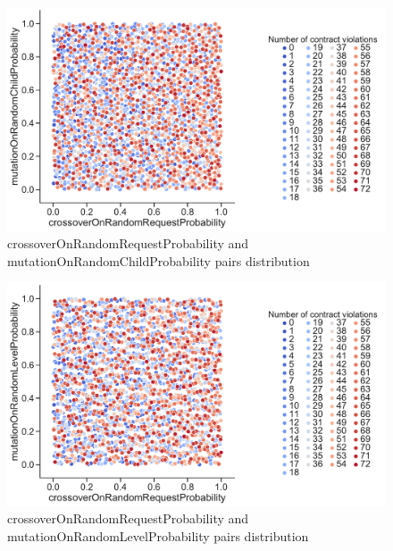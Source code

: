 \begin{figure}
	\centering
	\includegraphics[width=\textwidth]{images/PairsDistr/crossoverOnRandomRequestProbability_mutationOnRandomChildProbability.pdf}
	\caption[crossoverOnRandomRequestProbability and mutationOnRandomChildProbability pairs distribution]{crossoverOnRandomRequestProbability and mutationOnRandomChildProbability pairs distribution}
	\label{fig:crossoverOnRandomRequestProbability_mutationOnRandomChildProbability_pair}
\end{figure}
\clearpage
\begin{figure}
	\centering
	\includegraphics[width=\textwidth]{images/PairsDistr/crossoverOnRandomRequestProbability_mutationOnRandomLevelProbability.pdf}
	\caption[crossoverOnRandomRequestProbability and mutationOnRandomLevelProbability pairs distribution]{crossoverOnRandomRequestProbability and mutationOnRandomLevelProbability pairs distribution}
	\label{fig:crossoverOnRandomRequestProbability_mutationOnRandomLevelProbability_pair}
\end{figure}
\clearpage
